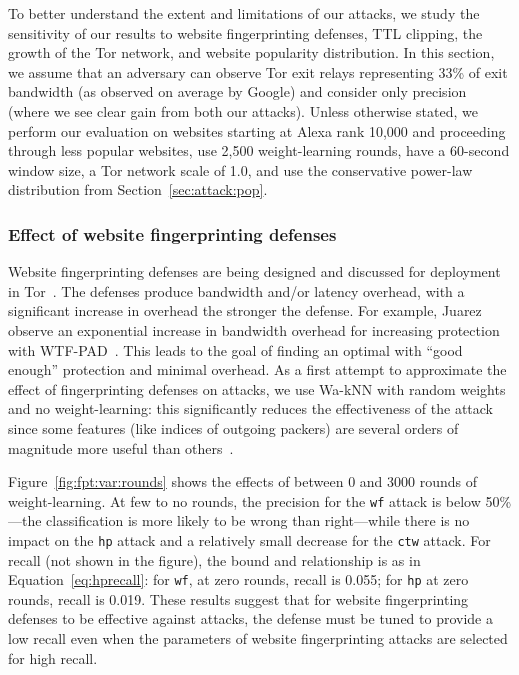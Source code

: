 To better understand the extent and limitations of our attacks, we
study the sensitivity of our results to website fingerprinting defenses,
TTL clipping, the growth of the Tor network, and website popularity
distribution.  In this section, we assume that an adversary can observe Tor
exit relays representing 33\% of exit bandwidth (as observed on average
by Google) and consider only precision (where we see clear gain from both our
attacks).  Unless otherwise stated, we perform our evaluation on
websites starting at Alexa rank 10,000 and proceeding through less
popular websites, use 2,500 weight-learning rounds, have a 60-second window
size, a Tor network scale of 1.0, and use the conservative power-law
distribution from Section~\ref{sec:attack:pop}.



\subsubsection{Effect of website fingerprinting defenses}

Website fingerprinting defenses are being
designed and discussed for deployment in Tor~\cite{adapativepadding}.
The defenses produce bandwidth and/or latency overhead, with a significant
increase in overhead the stronger the defense. For example, Juarez \ea
observe an exponential increase in bandwidth overhead for increasing protection
with WTF-PAD~\cite{DBLP:journals/corr/JuarezIPDW15}.
This leads to the goal of finding an optimal with ``good enough''
protection and minimal overhead.
As a first attempt to approximate the effect of fingerprinting
defenses on \name attacks, we use Wa-kNN with
random weights and no weight-learning: this significantly reduces the
effectiveness of the attack since some features (like indices of outgoing
packers) are several orders of magnitude more useful
than others~\cite{DBLP:journals/corr/JuarezIPDW15}.

Figure~\ref{fig:fpt:var:rounds} shows the effects of between 0 and 3000
rounds of weight-learning. At few to no rounds, the precision for the
\texttt{wf} attack is below 50\%---the classification is more likely to be wrong
than right---while there is no impact on the \texttt{hp} attack and a relatively
small decrease for the \texttt{ctw} attack.
For recall (not shown in the figure), the bound and relationship is
as in Equation~\ref{eq:hprecall}: for \texttt{wf}, at zero rounds, recall is
0.055; for \texttt{hp} at zero rounds, recall is 0.019. These results suggest
that for website fingerprinting defenses to be effective against \name attacks,
the defense must be tuned to provide a low recall even when the parameters of
website fingerprinting attacks are selected for high recall.

